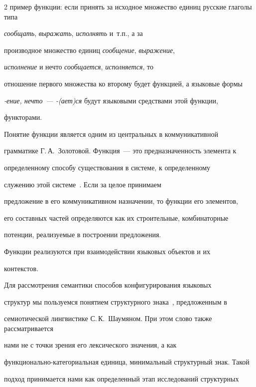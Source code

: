 \begin{multicols}{2}
пример функции: если принять за исходное множество единиц русские глаголы типа 


\textit{сообщать}, \textit{выражать}, \textit{исполнять} и~т.п., а за 


производное множество единиц \textit{сообщение}, \textit{выражение}, 


\textit{исполнение} и нечто \textit{сообщается}, \textit{исполняется}, то 


отношение первого множества ко второму будет функцией, а языковые формы 


\textit{-ение, нечто~---   -(ает)ся} будут языковыми средствами этой функции, 


функторами.





Понятие функции является одним из центральных в коммуникативной


грамматике Г.\,А.~Золотовой. Функция~--- это предназначенность элемента к


определенному способу существования в системе, к определенному


служению этой системе~\cite{24koz}. Если за целое принимаем


предложение в его коммуникативном назначении, то функции его элементов,


его составных частей определяются как их строительные, комбинаторные


потенции, реализуемые в построении предложения.





Функции реализуются при взаимодействии языковых объектов и их


контекстов.





Для рассмотрения семантики способов конфи\-гу\-ри\-ро\-ва\-ния языковых 


структур мы пользуемся понятием структурного знака~\cite{25koz}, предложенным в 


семиотической лингвистике С.\,К.~Шаумяном. При этом слово также рассматривается 


нами не с точки зрения его лексического зна\-чения, а как 


функционально-категориальная единица, мини\-маль\-ный структурный знак. Такой 


подход прини\-ма\-ет\-ся нами как определенный этап исследований структурных 



\end{multicols}
